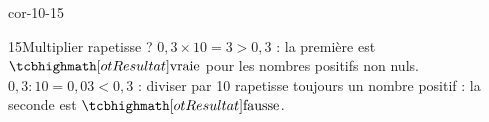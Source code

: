 \begin{blocLivre}{cor-10-15}\begin{corrige}{15}{Multiplier rapetisse ?}
$0{,}3\times10=3>0{,}3$ : la première est $\res{\text{vraie}}$ pour les nombres positifs non nuls. $0{,}3:10=0{,}03<0{,}3$ : diviser par 10 rapetisse toujours un nombre positif : la seconde est $\res{\text{fausse}}$.
\end{corrige}\end{blocLivre}
